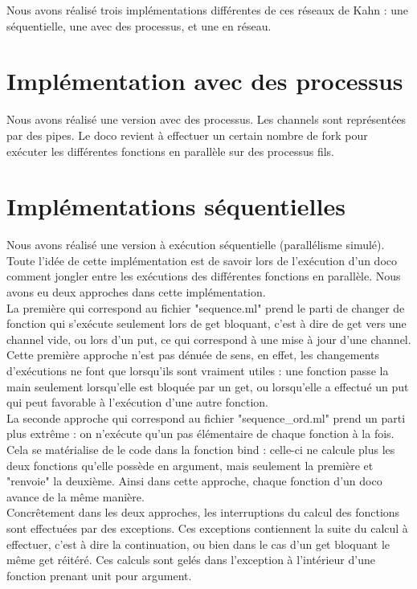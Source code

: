 \documentclass[a4paper, 12pt, twoside]{report}
\begin{document}
Nous avons réalisé trois implémentations différentes de ces réseaux de Kahn : une séquentielle, une avec des processus, et 
une en réseau.

\section{Implémentation avec des processus}

Nous avons réalisé une version avec des processus. Les channels sont représentées par des pipes. Le doco revient à 
effectuer un certain nombre de fork pour exécuter les différentes fonctions en parallèle sur des processus fils.

\section{Implémentations séquentielles}

Nous avons réalisé une version à exécution séquentielle (parallélisme simulé). Toute l'idée de cette implémentation est de 
savoir lors de l'exécution d'un doco comment jongler entre les exécutions des différentes fonctions en parallèle. Nous avons 
eu deux approches dans cette implémentation.\\

La première qui correspond au fichier "sequence.ml" prend le parti de changer de 
fonction qui s'exécute seulement lors de get bloquant, c'est à dire de get vers une channel vide, ou lors d'un put, ce qui 
correspond à une mise à jour d'une channel. Cette première approche n'est pas dénuée de sens, en effet, les changements 
d'exécutions ne font que lorsqu'ils sont vraiment utiles : une fonction passe la main seulement lorsqu'elle est bloquée par un get, 
ou lorsqu'elle a effectué un put qui peut favorable à l'exécution d'une autre fonction.\\

La seconde approche qui correspond au fichier "sequence\_ord.ml" prend un parti plus extrême : on n'exécute qu'un pas élémentaire 
de chaque fonction à la fois. Cela se matérialise de le code dans la fonction bind : celle-ci ne calcule plus les deux fonctions 
qu'elle possède en argument, mais seulement la première et "renvoie" la deuxième. Ainsi dans cette approche, 
chaque fonction d'un doco avance de la même manière.\\

Concrêtement dans les deux approches, les interruptions du calcul des fonctions sont effectuées par des exceptions. Ces exceptions 
contiennent la suite du calcul à effectuer, c'est à dire la continuation, ou bien dans le cas d'un get bloquant le même get réitéré. 
Ces calculs sont gelés dans l'exception à l'intérieur d'une fonction prenant unit pour argument.
\end{document}
